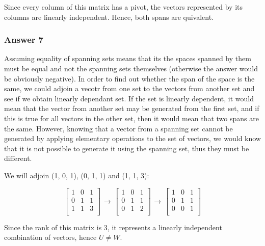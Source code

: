 \documentclass[11pt]{article}
\begin{document}
Since every column of this matrix has a pivot, the vectors represented by
its columns are linearly independent.  Hence, both spans are quivalent.
\subsubsection{Answer 7}
\label{sec-1-4-2}
Assuming equality of spanning sets means that its the spaces spanned by them
must be equal and not the spanning sets themselves (otherwise the answer
would be obviously negative).  In order to find out whether the span of the
space is the same, we could adjoin a vecotr from one set to the vectors from
another set and see if we obtain linearly dependant set.  If the set is
linearly dependent, it would mean that the vector from another set may be
generated from the first set, and if this is true for all vectors in the
other set, then it would mean that two spans are the same.  However, knowing
that a vector from a spanning set cannot be generated by applying elementary
operations to the set of vectors, we would know that it is not possible to
generate it using the spanning set, thus they must be different.

We will adjoin (1, 0, 1), (0, 1, 1) and (1, 1, 3):

\begin{equation*}
  \begin{bmatrix}
    1 & 0 & 1 \\
    0 & 1 & 1 \\
    1 & 1 & 3 \\
  \end{bmatrix}
  \begin{aligned} \to \end{aligned}
  \begin{bmatrix}
    1 & 0 & 1 \\
    0 & 1 & 1 \\
    0 & 1 & 2 \\
  \end{bmatrix}
  \begin{aligned} \to \end{aligned}
  \begin{bmatrix}
    1 & 0 & 1 \\
    0 & 1 & 1 \\
    0 & 0 & 1 \\
  \end{bmatrix}
\end{equation*}

Since the rank of this matrix is 3, it represents a linearly independent
combination of vectors, hence $U \neq W$.
\end{document}
